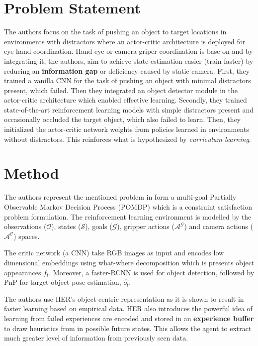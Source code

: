 \documentclass[11pt]{article}
\begin{document}
\section{Problem Statement}
\par The authors focus on the task of pushing an object to target locations in
environments with distractors where an actor-critic architecture is deployed for
eye-hand coordination. Hand-eye or camera-griper coordination is base on
\cite{soatto2013actionable} and by integrating it, the authors, aim to achieve
state estimation easier (train faster) by reducing an \textbf{information gap}
or deficiency caused by static camera. First, they trained a vanilla CNN for the
task of pushing an object with minimal distractors present, which failed. Then
they integrated an object detector module in the actor-critic architecture which
enabled effective learning. Secondly, they trained state-of-the-art reinforcement
learning models with simple distractors present and occasionally occluded the
target object, which also failed to learn. Then, they initialized the actor-critic
network weights from policies learned in environments without distractors. This
reinforces what is hypothesized by \textit{curriculum learning}.

\section{Method}
The authors represent the mentioned problem in form a multi-goal Partially
Observable Markov Decision Process (POMDP) which is a constraint satisfaction
problem formulation. The reinforcement learning environment is modelled by the
observations ($\mathcal{O}$), states ($\mathcal{S}$), goals ($\mathcal{G}$),
gripper actions ($\mathcal{A^G}$) and camera actions ($\mathcal{A^C}$) spaces.

The critic network (a CNN) take RGB images as input and encodes low dimensional
embeddings using what-where decomposition which is presents object appearances
$f_t$.
Moreover, a faster-RCNN \cite{ren2015faster} is used for object detection,
followed by PnP for target object pose estimation, $\hat{o_t}$.

The authors use HER's \cite{andrychowicz2017hindsight} object-centric
representation as it is shown to result in faster learning based on empirical
data. HER also introduces the powerful idea of learning from failed experiences
are encoded and stored in an \textbf{experience buffer} to draw heuristics from
in possible future states. This allows the agent to extract much greater level
of information from previously seen data.
\end{document}
